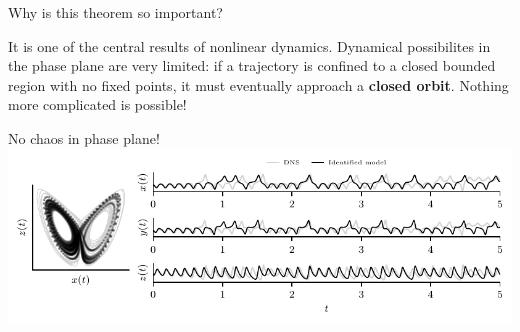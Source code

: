 \documentclass[usenames,dvipsnames,svgnames,10pt,aspectratio=169]{beamer}
\begin{document}
\begin{frame}[t, c]{Why is this theorem so important?}{}
  \begin{minipage}{.68\textwidth}
    It is one of the central results of nonlinear dynamics.
    Dynamical possibilites in the phase plane are very limited: if a trajectory is confined to a closed bounded region with no fixed points, it must eventually approach a \alert{\textbf{closed orbit}}.
    Nothing more complicated is possible!
  \end{minipage}%
  \hfill
  \begin{minipage}{.28\textwidth}
  \end{minipage}
\end{frame}

\begin{frame}[t, c]{No chaos in phase plane!}{}
  \centering
  \includegraphics[width=\textwidth]{attractor_comparison_bis}
\end{frame}
\end{document}
